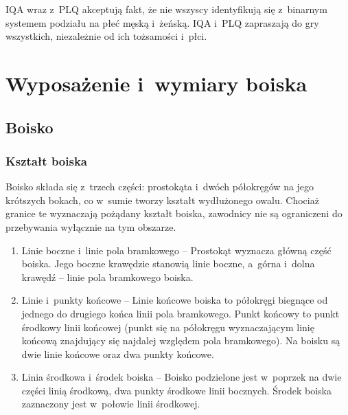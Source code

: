 \documentclass[12pt]{article}
\begin{document}
IQA wraz z~PLQ akceptują fakt, że nie wszyscy identyfikują się z~binarnym systemem podziału na płeć męską i~żeńską. IQA i~PLQ zapraszają
do gry wszystkich, niezależnie od ich tożsamości i~płci.

\pagebreak
\section{Wyposażenie i~wymiary boiska}

\subsection{Boisko}

\subsubsection{Kształt boiska}
Boisko składa się z~trzech części: prostokąta i~dwóch półokręgów na jego
krótszych bokach, co w~sumie tworzy kształt wydłużonego owalu. Chociaż
granice te wyznaczają pożądany kształt boiska, zawodnicy nie są
ograniczeni do przebywania wyłącznie na tym obszarze.
\begin{enumerate}
	\item{Linie boczne i~linie pola bramkowego} -- Prostokąt wyznacza
	      główną część boiska. Jego boczne krawędzie stanowią linie boczne, a~górna i~dolna krawędź -- linie pola bramkowego boiska.

	\item{Linie i~punkty końcowe} -- Linie końcowe boiska to
	      półokręgi biegnące od jednego do drugiego końca linii pola bramkowego.
	      Punkt końcowy to punkt środkowy linii końcowej (punkt się na półokręgu
	      wyznaczającym linię końcową znajdujący się najdalej względem pola
	      bramkowego). Na boisku są dwie linie końcowe oraz dwa punkty końcowe.

	\item{Linia środkowa i~środek boiska} -- Boisko podzielone
	      jest w~poprzek na dwie części linią środkową, dwa punkty środkowe linii
	      bocznych. Środek boiska zaznaczony jest w~połowie linii środkowej.
\end{enumerate}
\end{document}
